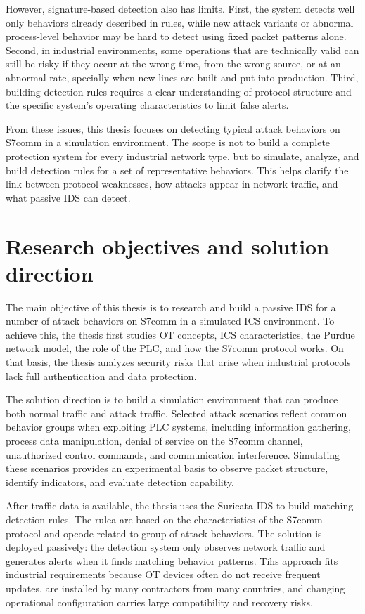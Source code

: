 \documentclass[../main.tex]{subfiles}
\begin{document}
However, signature-based detection also has limits. First, the system detects well only behaviors already described in rules, while new attack variants or abnormal process-level behavior may be hard to detect using fixed packet patterns alone. Second, in industrial environments, some operations that are technically valid can still be risky if they occur at the wrong time, from the wrong source, or at an abnormal rate, specially when new lines are built and put into production. Third, building detection rules requires a clear understanding of protocol structure and the specific system's operating characteristics to limit false alerts.

From these issues, this thesis focuses on detecting typical attack behaviors on S7comm in a simulation environment. The scope is not to build a complete protection system for every industrial network type, but to simulate, analyze, and build detection rules for a set of representative behaviors. This helps clarify the link between protocol weaknesses, how attacks appear in network traffic, and what passive IDS can detect.

\section{Research objectives and solution direction}

The main objective of this thesis is to research and build a passive IDS for a number of attack behaviors on S7comm in a simulated ICS environment. To achieve this, the thesis first studies OT concepts, ICS characteristics, the Purdue network model, the role of the PLC, and how the S7comm protocol works. On that basis, the thesis analyzes security risks that arise when industrial protocols lack full authentication and data protection.

The solution direction is to build a simulation environment that can produce both normal traffic and attack traffic. Selected attack scenarios reflect common behavior groups when exploiting PLC systems, including information gathering, process data manipulation, denial of service on the S7comm channel, unauthorized control commands, and communication interference. Simulating these scenarios provides an experimental basis to observe packet structure, identify indicators, and evaluate detection capability.

After traffic data is available, the thesis uses the Suricata IDS to build matching detection rules. The rulea are based on the characteristics of the S7comm protocol and opcode related to group of attack behaviors. The solution is deployed passively: the detection system only observes network traffic and generates alerts when it finds matching behavior patterns. Tihs approach fits industrial requirements because OT devices often do not receive frequent updates, are installed by many contractors from many countries, and changing operational configuration carries large compatibility and recovery risks.
\end{document}
